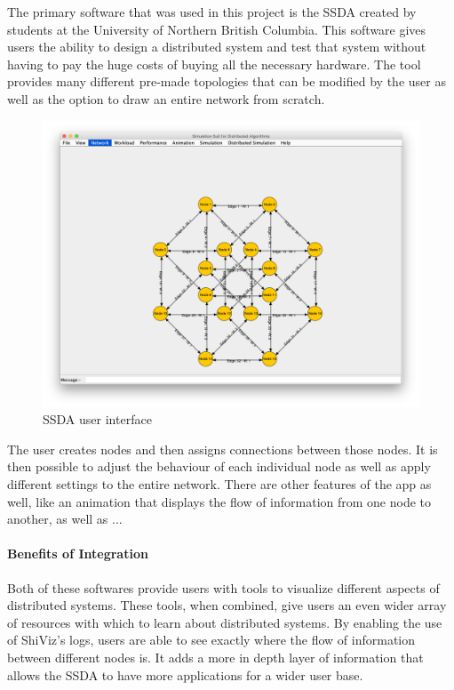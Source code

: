 \documentclass[12pt, oneside]{article}   	%
\begin{document}
The primary software that was used in this project is the SSDA created by students at the University of Northern British Columbia.  This software gives users the ability to design a distributed system and test that system without having to pay the huge costs of buying all the necessary hardware.  The tool provides many different pre-made topologies that can be modified by the user as well as the option to draw an entire network from scratch.  
\begin{figure}[h!!]
\caption{SSDA user interface}
\includegraphics[scale=0.3]{SSDA_Example.png} 
\centering
\end{figure}The user creates nodes and then assigns connections between those nodes.  It is then possible to adjust the behaviour of each individual node as well as apply different settings to the entire network. There are other features of the app as well, like an animation that displays the flow of information from one node to another, as well as ...


\paragraph{Benefits of Integration}

Both of these softwares provide users with tools to visualize different aspects of distributed systems.  These tools, when combined, give users an even wider array of resources with which to learn about distributed systems.  By enabling the use of ShiViz's logs, users are able to see exactly where the flow of information between different nodes is.  It adds a more in depth layer of information that allows the SSDA to have more applications for a wider user base.
\end{document}
